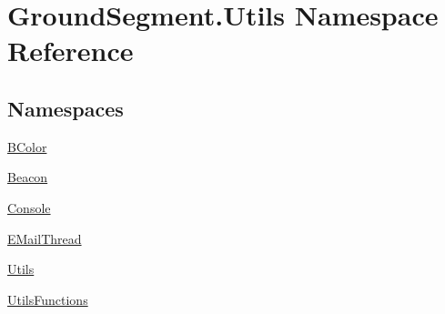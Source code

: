 \hypertarget{namespace_ground_segment_1_1_utils}{}\section{Ground\+Segment.\+Utils Namespace Reference}
\label{namespace_ground_segment_1_1_utils}
\subsection*{Namespaces}
\begin{DoxyCompactItemize}
\item 
 \hyperlink{namespace_ground_segment_1_1_utils_1_1_b_color}{B\+Color}
\item 
 \hyperlink{namespace_ground_segment_1_1_utils_1_1_beacon}{Beacon}
\item 
 \hyperlink{namespace_ground_segment_1_1_utils_1_1_console}{Console}
\item 
 \hyperlink{namespace_ground_segment_1_1_utils_1_1_e_mail_thread}{E\+Mail\+Thread}
\item 
 \hyperlink{namespace_ground_segment_1_1_utils_1_1_utils}{Utils}
\item 
 \hyperlink{namespace_ground_segment_1_1_utils_1_1_utils_functions}{Utils\+Functions}
\end{DoxyCompactItemize}
